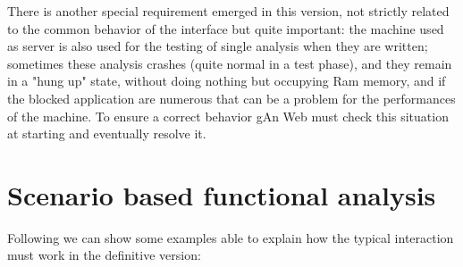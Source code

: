 There is another special requirement emerged in this version, not strictly related to the common behavior of the interface but quite important: the machine  used as server is also used for the testing of single analysis when they are written; sometimes these analysis crashes (quite normal in a test phase), and they remain in a "hung up" state, without doing nothing but occupying Ram memory, and if the blocked application are numerous that can be a problem for the performances of the machine. To ensure a correct behavior gAn Web must check this situation at starting and eventually resolve it.

\section{Scenario based functional analysis}
Following we can show some examples able to explain how the typical interaction must work in the definitive version:

